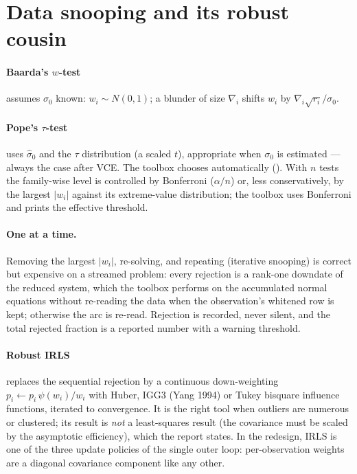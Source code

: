 \section{Data snooping and its robust cousin}
\label{sec:snooping}

\paragraph{Baarda's $w$-test} assumes $\sigma_0$ known: $w_i \sim N(0,1)$; a blunder of size $\nabla_i$ shifts $w_i$ by $\nabla_i\sqrt{r_i}/\sigma_0$. \paragraph{Pope's $\tau$-test} uses $\hat\sigma_0$ and the $\tau$ distribution (a scaled $t$), appropriate when $\sigma_0$ is estimated --- always the case after VCE. The toolbox chooses automatically (). With $n$ tests the family-wise level is controlled by Bonferroni ($\alpha/n$) or, less conservatively, by the largest $|w_i|$ against its extreme-value distribution; the toolbox uses Bonferroni and prints the effective threshold.

\paragraph{One at a time.} Removing the largest $|w_i|$, re-solving, and repeating (iterative snooping) is correct but expensive on a streamed problem: every rejection is a rank-one downdate of the reduced system, which the toolbox performs on the accumulated normal equations without re-reading the data when the observation's whitened row is kept; otherwise the arc is re-read. Rejection is recorded, never silent, and the total rejected fraction is a reported number with a warning threshold.

\paragraph{Robust IRLS} replaces the sequential rejection by a continuous down-weighting $p_i \leftarrow p_i\,\psi(w_i)/w_i$ with Huber, IGG3 (Yang 1994) or Tukey bisquare influence functions, iterated to convergence. It is the right tool when outliers are numerous or clustered; its result is \emph{not} a least-squares result (the covariance must be scaled by the asymptotic efficiency), which the report states. In the redesign, IRLS is one of the three update policies of the single outer loop: per-observation weights are a diagonal covariance component like any other.

